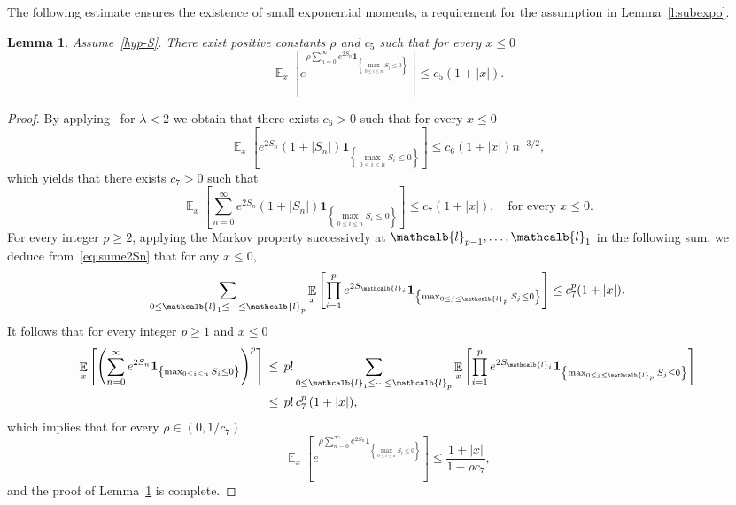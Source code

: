 \documentclass[10pt]{amsart}
\newtheorem{lemm}[theo]{Lemma}\newtheorem{prop}[theo]{Proposition}\newtheorem{coro}[theo]{Corollary}\newtheorem{conj}[theo]{Conjecture}
\theoremstyle{definition}\newtheorem{defi}[theo]{Definition}\newtheorem{rema}[theo]{Remark}\newtheorem{exam}[theo]{Example}\newtheorem{exem}[theo]{Example}\newtheorem{nota}[theo]{Notation}
\newcommand{\ind}{\mathbf{1}}
\DeclareMathOperator{\e}{\mathbb{E}}
\renewcommand{\ell}{\mathcalb{l}}
\begin{document}
The following estimate ensures the existence of small exponential moments, a requirement for the assumption in Lemma~\ref{l:subexpo}.


\begin{lemm}\label{l:rw1}
Assume~\eqref{hyp-S}. There exist positive constants $\rho$ and $c_5$ such that for every $x\le 0$
\begin{equation}
\e_x \left[e^{\rho \sum_{n=0}^\infty e^{ 2 S_n} \ind_{\left\{\max_{0\le i\le n} S_i \le 0\right\}} }\right]\le c_5 (1+|x|).
\end{equation}
\end{lemm}

\begin{proof}
By applying~\cite[Corollary~4.2]{kersting-vatutin} for $\lambda<2$ we obtain that there exists $c_6>0$ such that for every $x \le 0$
\begin{equation*}
\e_x \left[e^{2 S_n} (1+ |S_n|) \ind_{\left\{\max_{0\le i\le n} S_i \le 0\right\}}\right]
\le c_6 (1+|x|) n^{-3/2},
\end{equation*}
which yields that there exists $c_7>0$ such that
\begin{equation}\label{eq:sume2Sn}
\e_x \left[\sum_{n=0}^\infty e^{2 S_n} (1+ |S_n|) \ind_{\left\{\max_{0\le i\le n} S_i \le 0\right\}}\right]\le c_7 (1+|x|), \quad \text{for every } x\le 0.
\end{equation}
For every integer $p\ge 2$, applying the Markov property successively at ${\ell_{p-1}},\dots, \ell_1$ in the following sum, we deduce from~\eqref{eq:sume2Sn} that for any $x\le 0$,
\begin{equation*}
\sum_{0\le \ell_1\le\dots\le \ell_p}\e_x \left[\prod_{i=1}^{p} e^{2 S_{\ell_i}} \ind_{\left\{\max_{0\le j \le \ell_p} S_j \le 0\right\}}\right]
\le c_7^p (1+|x|).
\end{equation*}
It follows that for every integer $p\ge 1$ and $x\le 0$
\begin{align*}
\e_x \left[\left(\sum_{n=0}^\infty e^{2 S_n} \ind_{\left\{\max_{0\le i\le n} S_i \le 0\right\}}\right)^p\right]
\, & \le\, p! \sum_{0\le \ell_1\le\dots\le \ell_p}\e_x \left[\prod_{i=1}^{p} e^{2 S_{\ell_i}} \ind_{\left\{\max_{0\le j \le \ell_p} S_j \le 0\right\}}\right]
\\
\, & \le\, p! \, c_7^p \, (1+|x|),
\end{align*}
which implies that for every $\rho \in (0, 1/c_7)$
\begin{equation*}
\e_x\left[e^{\rho \sum_{n=0}^\infty e^{ 2 S_n} \ind_{\left\{\max_{0\le i\le n} S_i \le 0\right\}}}\right]\le \frac{1+|x|}{1- \rho  c_7},
\end{equation*}
and the proof of Lemma~\ref{l:rw1} is complete.
\end{proof}
\end{document}
